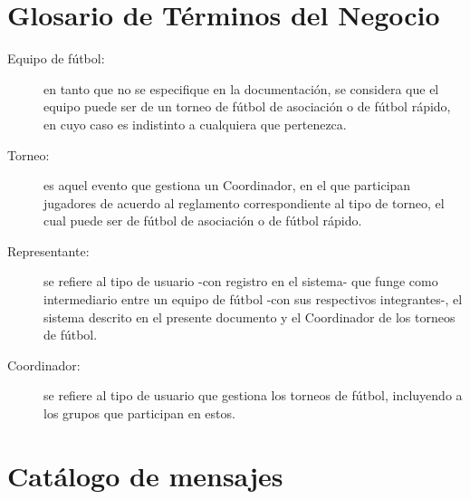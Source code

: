 \section{Glosario de Términos del Negocio}

\begin{description}
	\item[Equipo de fútbol:] en tanto que no se especifique en la documentación, se considera que el equipo puede ser de un torneo de fútbol de asociación o de fútbol rápido, en cuyo caso es indistinto a cualquiera que pertenezca.
	\item[Torneo:] es aquel evento que gestiona un Coordinador, en el que participan jugadores de acuerdo al reglamento correspondiente al tipo de torneo, el cual puede ser de fútbol de asociación o de fútbol rápido.
	\item[Representante:] se refiere al tipo de usuario -con registro en el sistema- que funge como intermediario entre un equipo de fútbol -con sus respectivos integrantes-, el sistema descrito en el presente documento y el Coordinador de los torneos de fútbol. 
	\item[Coordinador:] se refiere al tipo de usuario que gestiona los torneos de fútbol, incluyendo a los grupos que participan en estos.
\end{description}

\section{Catálogo de mensajes}


